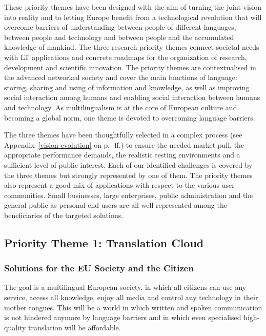 \documentclass[10pt, plain]{../../metanetpaper}
\begin{document}
\begin{multicols}{2}
These priority themes have been designed with the aim of turning the joint vision into reality and to letting Europe benefit from a technological revolution that will overcome barriers of understanding between people of different languages, between people and technology and between people and the accumulated knowledge of mankind. The three research priority themes connect societal needs with LT applications and concrete roadmaps for the organization of research, development and scientiﬁc innovation. The priority themes are contextualised in the advanced networked society and cover the main functions of language: storing, sharing and using of information and knowledge, as well as improving social interaction among humans and enabling social interaction between humans and technology. As multilingualism is at the core of European culture and becoming a global norm, one theme is devoted to overcoming language barriers. 

The three themes have been thoughtfully selected in a complex process (see Appendix~\ref{vision-evolution} on p.~\pageref{vision-evolution}\,ff.) to ensure the needed market pull, the appropriate performance demands, the realistic testing environments and a sufficient level of public interest. Each of our identified challenges is covered by the three themes but strongly represented by one of them. The priority themes also represent a good mix of applications with respect to the various user communities. Small businesses, large enterprises, public administration and the general public as personal end users are all well represented among the beneficiaries of the targeted solutions.

\subsection{Priority Theme 1: Translation Cloud}
\label{sec:priority-theme-1-translation-cloud}

\subsubsection{Solutions for the EU Society and the Citizen}
\label{sec:solutions-eu-society-pt1}

The goal is a multilingual European society, in which all citizens can use any service, access all knowledge, enjoy all media and control any technology in their mother tongues. This will be a world in which written and spoken communication is not hindered anymore by language barriers and in which even specialised high-quality translation will be affordable.
 

\end{multicols}
\end{document}
